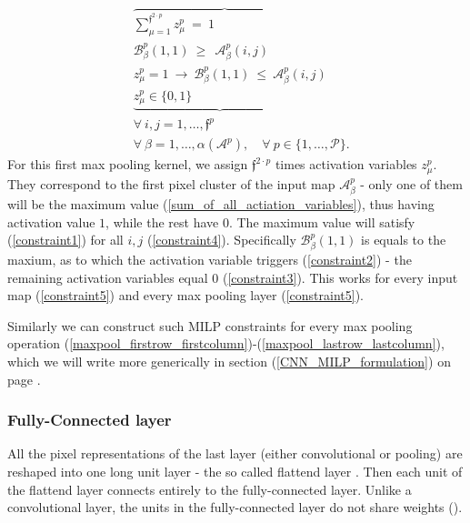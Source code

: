 \documentclass{article}
\begin{document}
\begin{align}
&\overbrace{\sum_{\mu =1}^{\mathfrak{f}^{2\cdot p}} z_\mu ^p \ = \ 1 \qquad \qquad \qquad\qquad} \label{sum_of_all_actiation_variables}\\
& \mathcal{B}_\beta^p(1,1) \ \geq \ \ \mathcal{A}_\beta^p(i,j) \label{constraint1} \\
& z_\mu^p = 1 \ \to \ \mathcal{B}_\beta^p(1,1) \ \leq \ \mathcal{A}_\beta^p(i,j) \label{constraint2} \\
& \underbrace{ z_\mu^p \in \{0, 1\} \qquad \qquad \qquad \qquad \quad} \label{constraint3}\\
& \forall \ i,j = 1, \ldots, \mathfrak{f}^p \label{constraint4}\\
& \forall \ \beta = 1, \ldots, \alpha(\mathcal{A}^p), \quad \forall \
p \in \{ 1, \ldots, \mathcal{P} \} \label{constraint5}.
\end{align}
For this first max pooling kernel, we assign $\mathfrak{f}^{2\cdot p}$ times activation variables $z_\mu^p$. They correspond to the first pixel cluster of the input map $\mathcal{A}_\beta^p$ - only one of them will be the maximum value (\ref{sum_of_all_actiation_variables}), thus having activation value $1$, while the rest have $0$. The maximum value will satisfy (\ref{constraint1}) for all $i,j$ (\ref{constraint4}). Specifically $\mathcal{B}_\beta^p(1,1)$ is equals to the maxium, as to which the activation variable triggers (\ref{constraint2}) - the remaining activation variables equal $0$ (\ref{constraint3}). This works for every input map (\ref{constraint5}) and every max pooling layer (\ref{constraint5}).


Similarly we can construct such MILP constraints for every max pooling operation (\ref{maxpool_firstrow_firstcolumn})-(\ref{maxpool_lastrow_lastcolumn}), which we will write more generically in section (\ref{CNN_MILP_formulation}) on page \pageref{CNN_MILP_formulation}.


\subsubsection{Fully-Connected layer} All the pixel representations of the last layer (either convolutional or pooling) are reshaped into one long unit layer - the so called flattend layer \cite{wiki_convnets}. Then each unit of the flattend layer connects entirely to the fully-connected layer. Unlike a convolutional layer, the units in the fully-connected layer do not share weights (\cite{cs231:optimizers}).
\end{document}
